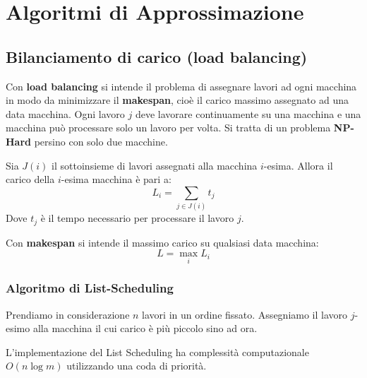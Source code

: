 \documentclass[\main/main.tex]{subfiles}
\begin{document}
\chapter{Algoritmi di Approssimazione}
\section{Bilanciamento di carico (load balancing)}
Con \textbf{load balancing} si intende il problema di assegnare lavori ad ogni macchina in modo da minimizzare il \textbf{makespan}, cioè il carico massimo assegnato ad una data macchina. Ogni lavoro \(j\) deve lavorare continuamente su una macchina e una macchina può processare solo un lavoro per volta. Si tratta di un problema \textbf{NP-Hard} persino con solo due macchine.
\begin{definition}[Carico]
  Sia \(J(i)\) il sottoinsieme di lavori assegnati alla macchina \(i\)-esima.
  Allora il carico della \(i\)-esima macchina è pari a:
  \[
    L_i = \sum_{j \in J(i)} t_j
  \]
  Dove \(t_j\) è il tempo necessario per processare il lavoro \(j\).
\end{definition}
\begin{definition}[Makespan]
  Con \textbf{makespan} si intende il massimo carico su qualsiasi data macchina:
  \[
    L = \max_{i} L_i
  \]
\end{definition}
\subsection{Algoritmo di List-Scheduling}
Prendiamo in considerazione \(n\) lavori in un ordine fissato. Assegniamo il lavoro \(j\)-esimo alla macchina il cui carico è più piccolo sino ad ora.

\begin{complexity}
  L'implementazione del List Scheduling ha complessità computazionale \(O(n\log m)\) utilizzando una coda di priorità.
\end{complexity}
\end{document}
